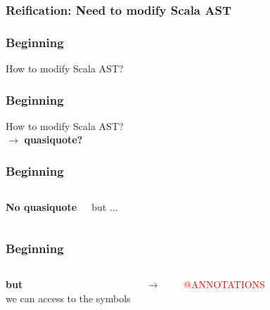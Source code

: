 \documentclass{beamer}
\newcommand{\TCR}{\textcolor{red}}
\begin{document}

\begin{frame}
\frametitle{Reification: Need to modify Scala AST}



\end{frame}


\begin{frame}
\frametitle{Beginning}

How to modify Scala AST?\\

\end{frame}


\begin{frame}
\frametitle{Beginning}

How to modify Scala AST?\\
$\rightarrow $ \textbf{quasiquote?}\\

\end{frame}



\begin{frame}
\frametitle{Beginning}
\begin{columns}[c] %

\textbf{No quasiquote}

but ...
\end{columns}
\end{frame}


\begin{frame}
\frametitle{Beginning}
\begin{columns}[c] %

\textbf{but}\\
we can access to the symbols 

$\rightarrow$

~ \TCR{@ANNOTATIONS}

\end{columns}
\end{frame}
\end{document}
